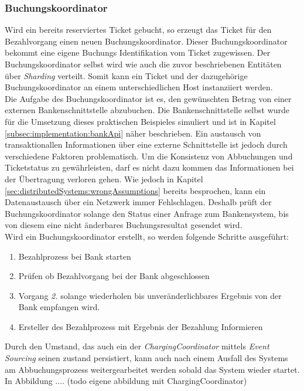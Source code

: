 \subsubsection{Buchungskoordinator}
Wird ein bereits reserviertes Ticket gebucht, so erzeugt das Ticket für den Bezahlvorgang einen neuen Buchungskoordinator. Dieser Buchungskoordinator bekommt eine eigene Buchungs Identifikation vom Ticket zugewissen. Der Buchungskoordinator selbst wird wie auch die zuvor beschriebenen Entitäten über \textit{Sharding} verteilt. Somit kann ein Ticket und der dazugehörige Buchungskoordinator an einem unterschiedlichen Host instanziiert werden. \\
Die Aufgabe des Buchungskoordinator ist es, den gewünschten Betrag von einer externen Bankenschnittstelle abzubuchen. Die Bankenschnittstelle selbst wurde für die Umsetzung dieses praktischen Beispieles simuliert und ist in Kapitel \ref{subsec:implementation:bankApi} näher beschrieben. Ein austausch von transaktionallen Informationen über eine externe Schnittstelle ist jedoch durch verschiedene Faktoren problematisch. Um die Konsistenz von Abbuchungen und Ticketstatus zu gewährleisten, darf es nicht dazu kommen das Informationen bei der Übertragung verloren gehen. Wie jedoch in Kapitel \ref{sec:distributedSystems:wrongAssumptions} bereits besprochen, kann ein Datenaustausch über ein Netzwerk immer Fehlschlagen. Deshalb prüft der Buchungskoordinator solange den Status einer Anfrage zum Bankensystem, bis von diesem eine nicht änderbares Buchungsresultat gesendet wird. \\
Wird ein Buchungskoordinator erstellt, so werden folgende Schritte ausgeführt:
\begin{enumerate}
    \item Bezahlprozess bei Bank starten
    \item Prüfen ob Bezahlvorgang bei der Bank abgeschlossen
    \item Vorgang \textit{2.} solange wiederholen bis unveränderlichbares Ergebnis von der Bank empfangen wird.
    \item Ersteller des Bezahlprozess mit Ergebnis der Bezahlung Informieren
\end{enumerate}
Durch den Umstand, das auch ein der \textit{ChargingCoordinator} mittels \textit{Event Sourcing} seinen zustand persistiert, kann auch nach einem Ausfall des Systems am Abbuchungsprozess weitergearbeitet werden sobald das System wieder startet. \\
In Abbildung .... (todo eigene abbildung mit ChargingCoordinator)